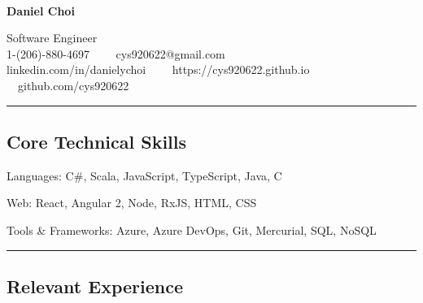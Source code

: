 \documentclass[10pt,letterpaper]{article}
\newenvironment{indentsection}[1]%
{\begin{list}{}%
	{\setlength{\leftmargin}{#1}}%
	\item[]%
}
{\end{list}}
\newcommand{\CPP}
{C\nolinebreak[4]\hspace{-.05em}\raisebox{.22ex}{\footnotesize\bf ++}}
\begin{document}

\begin{center}
\thispagestyle{firststyle}
{\LARGE \textbf{\\Daniel Choi}}

Software Engineer
\\
1-(206)-880-4697\ \ \textbullet
\ \ cys920622@gmail.com
\\
linkedin.com/in/danielychoi\ \ \textbullet
\ \ https://cys920622.github.io\ \ \textbullet
\ \ github.com/cys920622\ \ \textbullet
\end{center}

\hrule
\vspace{-0.4em}

\subsection*{Core Technical Skills}

\begin{indentsection}{\parindent}
\begin{description*}
	\item[Languages:]
	C\#, Scala, JavaScript, TypeScript, Java, \CPP
	\item[Web:]
	React, Angular 2, Node, RxJS, HTML, CSS
	\item[Tools \& Frameworks:]
	Azure, Azure DevOps, Git, Mercurial, SQL, NoSQL
\end{description*}
\end{indentsection}


\hrule
\vspace{-0.4em}

\subsection*{Relevant Experience}
\end{document}
